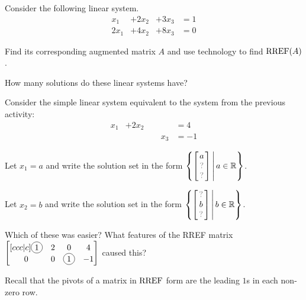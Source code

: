 \begin{applicationActivities}
\begin{activity}{10}
  Consider the following linear system.
  	\begin{alignat*}{4}
  		x_1 &+ 2x_2 &+ 3x_3 &= 1\\
  	  2x_1 &+ 4x_2 &+ 8x_3 &= 0
  	\end{alignat*}
  \begin{subactivity}
    Find its corresponding augmented matrix \(A\) and
    use technology to find \(\operatorname{RREF}(A)\).
  \end{subactivity}
  \begin{subactivity}
    How many solutions do these linear systems have?
  \end{subactivity}
\end{activity}

\begin{activity}{10}
Consider the simple linear system equivalent to the system
from the previous activity:
	\begin{alignat*}{3}
		x_1 &+ 2x_2 & &= 4\\
	     	 & &\phantom{+}x_3 &= -1
	\end{alignat*}
\begin{subactivity}
Let \(x_1=a\) and write the solution set in the form
\(
  \setBuilder
  {
    \begin{bmatrix} a \\ \unknown \\ \unknown \end{bmatrix}
  }{
    a \in \IR
  }
\).
\end{subactivity}
\begin{subactivity}
Let \(x_2=b\) and write the solution set in the form
\(
  \setBuilder
  {
    \begin{bmatrix} \unknown \\ b \\ \unknown \end{bmatrix}
  }{
    b \in \IR
  }
\).
\end{subactivity}
\begin{subactivity}
Which of these was easier?  What features of the RREF matrix
\(
  \begin{bmatrix}[ccc|c]
    \circledNumber{1} & 2 & 0 & 4 \\
    0 & 0 & \circledNumber{1} & -1
  \end{bmatrix}
\) caused this?
\end{subactivity}
\end{activity}

\begin{definition}
Recall that the pivots of a matrix in \(\operatorname{RREF}\) form are the leading
\(1\)s in each non-zero row.


\end{definition}
\end{applicationActivities}
